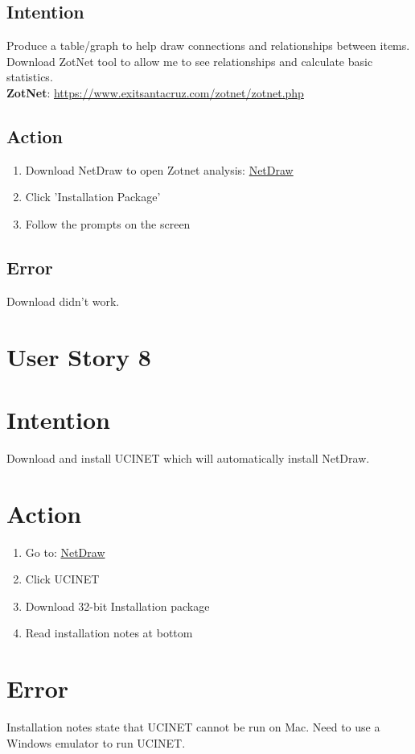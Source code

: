 \documentclass{article}
\begin{document}
\subsection{Intention}
Produce a table/graph to help draw connections and relationships between items. Download ZotNet tool to allow me to see relationships and calculate basic statistics. \\
\textbf{ZotNet}: \href{https://www.exitsantacruz.com/zotnet/zotnet.php}{https://www.exitsantacruz.com/zotnet/zotnet.php}
\subsection{Action}
\begin{enumerate}
    \item Download NetDraw to open Zotnet analysis: \href{https://sites.google.com/site/netdrawsoftware/home}{NetDraw}
    \item Click 'Installation Package'
    \item Follow the prompts on the screen 
\end{enumerate}
\subsection{Error}
Download didn't work.

\section{User Story 8}
\section{Intention}
Download and install UCINET which will automatically install NetDraw.
\section{Action}
\begin{enumerate}
    \item Go to: \href{https://sites.google.com/site/netdrawsoftware/home}{NetDraw}
    \item Click UCINET
    \item Download 32-bit Installation package 
    \item Read installation notes at bottom
\end{enumerate}
\section{Error}
Installation notes state that UCINET cannot be run on Mac. Need to use a Windows emulator to run UCINET. 
\end{document}
